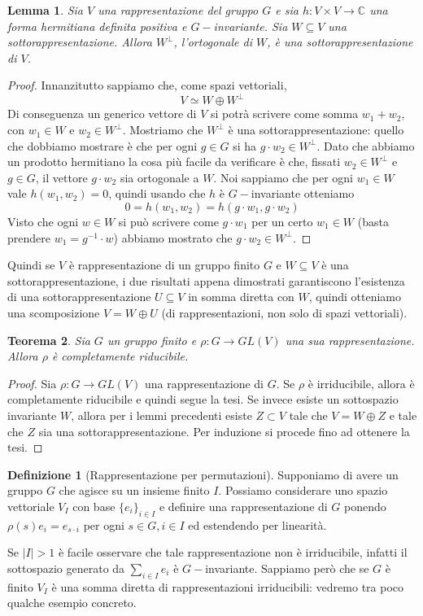 \documentclass[11pt]{article}
\theoremstyle{plain}
\newtheorem{thm}{Teorema}[section]
\newtheorem{lemma}[thm]{Lemma}
\theoremstyle{definition}
\newtheorem{defn}{Definizione}[section]
\theoremstyle{remark}
\newcommand{\C}{\mathbb{C}}
\DeclareMathOperator{\iso}{\simeq}
\begin{document}
\begin{lemma}
Sia $V$ una rappresentazione del gruppo $G$ e sia $h: V \times V \to \C$ una forma hermitiana definita positiva e $G-$invariante.
Sia $W\subseteq V$ una sottorappresentazione. Allora $W^\perp$, l'ortogonale di $W$, è una sottorappresentazione di $V$.
\end{lemma}
\begin{proof}
Innanzitutto sappiamo che, come spazi vettoriali,
\[ V \iso W \oplus W^\perp \]
Di conseguenza un generico vettore di $V$ si potrà scrivere come somma $w_1 + w_2$, con $w_1 \in W$ e $w_2 \in W^\perp$.
Mostriamo che $W^\perp$ è una sottorappresentazione: quello che dobbiamo mostrare è che per ogni $g\in G$ si ha $g\cdot w_2 \in W^\perp$.
Dato che abbiamo un prodotto hermitiano la cosa più facile da verificare è che, fissati $w_2\in W^\perp$ e $g\in G$, il vettore $g\cdot w_2$ sia ortogonale a $W$.
Noi sappiamo che per ogni $w_1\in W$ vale $h(w_1, w_2)=0$, quindi usando che $h$ è $G-$invariante otteniamo 
\[ 0 = h(w_1, w_2) = h(g\cdot w_1, g\cdot w_2)\]
Visto che ogni $w\in W$ si può scrivere come $g\cdot w_1$ per un certo $w_1\in W$ (basta prendere $w_1 = g^{-1}\cdot w$)
abbiamo mostrato che $g\cdot w_2 \in W^\perp$.
\end{proof}

Quindi se $V$ è rappresentazione di un gruppo finito $G$ e $W\subseteq V$ è una sottorappresentazione,
i due risultati appena dimostrati garantiscono l'esistenza di una sottorappresentazione $U\subseteq V$ in somma diretta con $W$,
quindi otteniamo una scomposizione $V = W\oplus U$ (di rappresentazioni, non solo di spazi vettoriali). 

\begin{thm}
  \label{thm:gruppo finito completamente riducibile}
  Sia $G$ un gruppo finito e $\rho: G \to GL(V)$ una sua rappresentazione. Allora $\rho$ è completamente riducibile.
\end{thm}
\begin{proof}
Sia $\rho: G \to GL(V)$ una rappresentazione di $G$. Se $\rho$ è irriducibile, allora è completamente riducibile e quindi segue la tesi. Se invece esiste un sottospazio invariante $W$, allora per i lemmi precedenti esiste $Z \subset V$ tale che $V = W \oplus Z$ e tale che $Z$ sia una sottorappresentazione. Per induzione si procede fino ad ottenere la tesi.
\end{proof}




\begin{defn}[Rappresentazione per permutazioni]
Supponiamo di avere un gruppo $G$ che agisce su un insieme finito $I$.
Possiamo considerare uno spazio vettoriale $V_I$ con base $\{e_i\}_{i\in I}$ e definire una rappresentazione di $G$ ponendo
$\rho(s)e_i = e_{s\cdot i}$ per ogni $s\in G, i\in I$ ed estendendo per linearità. 
\end{defn}
Se $|I|>1$ è facile osservare che tale rappresentazione 
non è irriducibile, infatti il sottospazio generato da $\sum_{i\in I} e_i$ è $G-$invariante.
Sappiamo però che se $G$ è finito $V_I$ è una somma diretta di rappresentazioni irriducibili: vedremo tra poco qualche esempio concreto.
\end{document}
